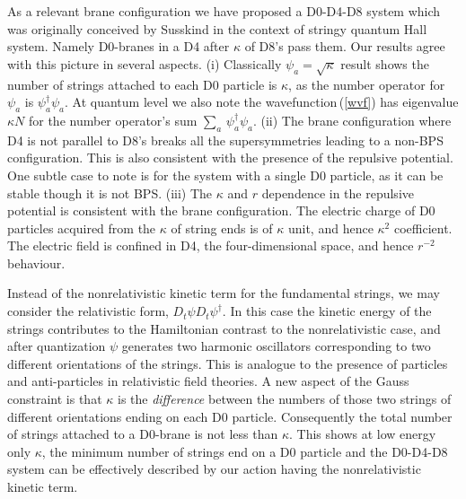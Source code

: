 \documentclass[a4paper,12pt]{article}
\begin{document}
As a relevant brane configuration we have  proposed a D0-D4-D8 system which was originally conceived by Susskind
in the context of stringy quantum Hall system. Namely D0-branes in a D4 after $\kappa$ of D8's  pass them.  Our
results agree with this picture in several aspects. \newline (i) Classically  $\psi_{a}=\sqrt{\kappa}$ result
shows the number of strings attached to each D0 particle is $\kappa$, as the  number operator for $\psi_{a}$ is
$\psi^{\dagger}_{a}\psi_{a}$. At quantum level we also note  the wavefunction\,(\ref{wvf}) has eigenvalue $\kappa
N$ for the number operator's sum $\sum_{a}\,\psi^{\dagger}_{a}\psi_{a}$. (ii) The  brane configuration where D4 is
not parallel to D8's  breaks all the supersymmetries leading to a non-BPS configuration. This is also consistent
with the presence of the repulsive potential. One subtle case to note is  for the system with a  single D0
particle, as it can be   stable  though it is not BPS. (iii) The $\kappa$ and $r$ dependence in the repulsive
potential is consistent with the  brane configuration.  The electric charge of D0 particles  acquired from the
$\kappa$ of string ends is of  $\kappa$ unit, and hence $\kappa^{2}$ coefficient.  The electric field is confined
in D4, the four-dimensional space, and hence $r^{-2}$ behaviour.\newline



Instead of the nonrelativistic kinetic term for the fundamental strings, we may consider the relativistic form,
$D_{t}\psi D_{t}\psi^{\dagger}$. In this case the kinetic energy of the strings contributes to the Hamiltonian
contrast to the nonrelativistic case, and after quantization $\psi$ generates two harmonic oscillators
corresponding to two different orientations of the  strings. This is analogue to the presence of  particles and
anti-particles  in relativistic field theories. A new aspect of the Gauss constraint is that  $\kappa$ is the
\textit{difference} between the numbers of  those two strings of different orientations ending on each D0
particle. Consequently  the total number of strings attached to a D0-brane is not less than $\kappa$. This shows
at low energy only $\kappa$, the minimum number of strings  end on a D0 particle and the D0-D4-D8 system can be
effectively described by  our action having the nonrelativistic kinetic term.\newline
\end{document}
